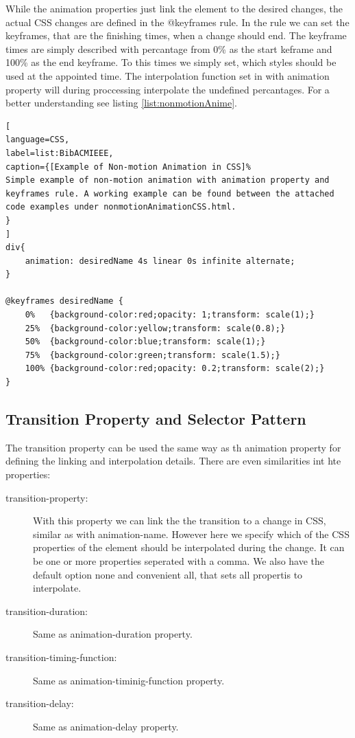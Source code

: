 While the animation properties just link the element to the desired changes, the actual CSS changes are defined in the @keyframes rule. In the rule we can set the keyframes, that are the finishing times, when a change should end. The keyframe times are simply described with percantage from 0\% as the start keframe and 100\% as the end keyframe. To this times we simply set, which styles should be used at the appointed time. The interpolation function set in with animation property will during proccessing interpolate the undefined percantages. For a better understanding see listing \ref{list:nonmotionAnime}.


\begin{lstlisting}[
language=CSS,
label=list:BibACMIEEE,
caption={[Example of Non-motion Animation in CSS]%
Simple example of non-motion animation with animation property and keyframes rule. A working example can be found between the attached code examples under nonmotionAnimationCSS.html.
}
]
div{
	animation: desiredName 4s linear 0s infinite alternate;
}

@keyframes desiredName {
	0%   {background-color:red;opacity: 1;transform: scale(1);}
	25%  {background-color:yellow;transform: scale(0.8);}
	50%  {background-color:blue;transform: scale(1);}
	75%  {background-color:green;transform: scale(1.5);}
	100% {background-color:red;opacity: 0.2;transform: scale(2);}
}
\end{lstlisting}
\label{list:nonmotionAnime}

\subsection{Transition Property and Selector Pattern} %
\label{sub:CSS_transition}

The transition property can be used the same way as th animation property for defining the linking and interpolation details. There are even similarities int hte properties:

\begin{description}
\item [transition-property:] With this property we can link the the transition to a change in CSS, similar as with animation-name. However here we specify which of the CSS properties of the element should be interpolated during the change. It can be one or more properties seperated with a comma. We also have the default option none and convenient all, that sets all propertis to interpolate.
\item [transition-duration:] Same as animation-duration property.
\item [transition-timing-function:] Same as animation-timinig-function property.
\item [transition-delay:] Same as animation-delay property.
\end{description}

